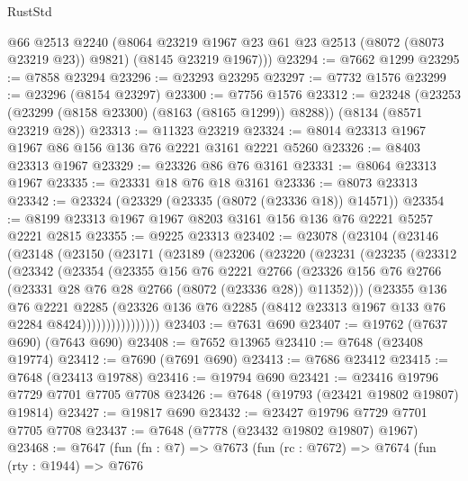 \begin{lexlean}{RustStd}
\begin{coremodule}
        @66
        @2513
        @2240
        (@8064 @23219 @1967 @23 @61 @23 @2513 (@8072 (@8073 @23219 @23)) @9821)
        (@8145 @23219 @1967)))
@23294 := @7662 @1299
@23295 := @7858 @23294
@23296 := @23293 @23295
@23297 := @7732 @1576
@23299 := @23296 (@8154 @23297)
@23300 := @7756 @1576
@23312 := @23248
    (@23253 (@23299 (@8158 @23300) (@8163 (@8165 @1299)) @8288))
    (@8134 (@8571 @23219 @28))
@23313 := @11323 @23219
@23324 := @8014 @23313 @1967 @1967 @86 @156 @136 @76 @2221 @3161 @2221 @5260
@23326 := @8403 @23313 @1967
@23329 := @23326 @86 @76 @3161
@23331 := @8064 @23313 @1967
@23335 := @23331 @18 @76 @18 @3161
@23336 := @8073 @23313
@23342 := @23324 (@23329 (@23335 (@8072 (@23336 @18)) @14571))
@23354 := @8199 @23313 @1967 @1967 @8203 @3161 @156 @136 @76 @2221 @5257 @2221 @2815
@23355 := @9225 @23313
@23402 := @23078
    (@23104
      (@23146
        (@23148
          (@23150
            (@23171
              (@23189
                (@23206
                  (@23220
                    (@23231
                      (@23235
                        (@23312
                          (@23342
                            (@23354
                              (@23355
                                @156
                                @76
                                @2221
                                @2766
                                (@23326
                                  @156
                                  @76
                                  @2766
                                  (@23331 @28 @76 @28 @2766 (@8072 (@23336 @28)) @11352)))
                              (@23355
                                @136
                                @76
                                @2221
                                @2285
                                (@23326
                                  @136
                                  @76
                                  @2285
                                  (@8412 @23313 @1967 @133 @76 @2284 @8424))))))))))))))))
@23403 := @7631 @690
@23407 := @19762 (@7637 @690) (@7643 @690)
@23408 := @7652 @13965
@23410 := @7648 (@23408 @19774)
@23412 := @7690 (@7691 @690)
@23413 := @7686 @23412
@23415 := @7648 (@23413 @19788)
@23416 := @19794 @690
@23421 := @23416 @19796 @7729 @7701 @7705 @7708
@23426 := @7648 (@19793 (@23421 @19802 @19807) @19814)
@23427 := @19817 @690
@23432 := @23427 @19796 @7729 @7701 @7705 @7708
@23437 := @7648 (@7778 (@23432 @19802 @19807) @1967)
@23468 := @7647
    (fun (fn : @7) =>
    @7673
      (fun (rc : @7672) =>
      @7674
        (fun (rty : @1944) =>
        @7676

\end{coremodule}
\end{lexlean}
